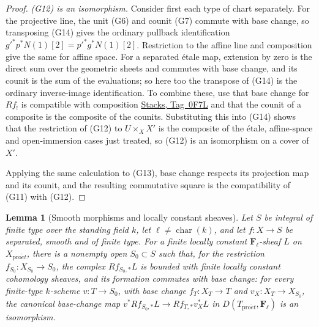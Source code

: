 \documentclass[11pt,a4paper]{article}
\numberwithin{equation}{section}
\newtheorem{lemma}[theorem]{Lemma}
\theoremstyle{definition}
\theoremstyle{remark}
\newcommand{\Fell}{\mathbf F_\ell}
\newcommand{\proet}{\mathrm{pro}\acute{e}t}
\newcommand{\stacks}[1]{\href{https://stacks.math.columbia.edu/tag/#1}{\textnormal{Stacks, Tag~#1}}}
\begin{document}
\begin{proof}
\emph{(G12) is an isomorphism.} Consider first each type of chart
separately. For the projective line, the unit (G6) and counit (G7)
commute with base change, so transposing (G14) gives the ordinary
pullback identification \(g'^*p^*N(1)[2]=p'^*g^*N(1)[2]\). Restriction
to the affine line and composition give the same for affine space. For
a separated \'etale map, extension by zero is the direct sum over the
geometric sheets and commutes with base change, and its counit is the
sum of the evaluations; so here too the transpose of (G14) is the
ordinary inverse-image identification. To combine these, use that base
change for \(Rf_!\) is compatible with composition \stacks{0F7L} and
that the counit of a composite is the composite of the counits.
Substituting this into (G14) shows that the restriction of (G12) to
\(U\times_XX'\) is the composite of the \'etale, affine-space and
open-immersion cases just treated, so (G12) is an isomorphism on a
cover of \(X'\).

Applying the same calculation to (G13), base change respects its
projection map and its counit, and the resulting commutative square is
the compatibility of (G11) with (G12).
\end{proof}

\begin{lemma}[Smooth morphisms and locally constant sheaves]
\label{b:lem:geo-smooth-generic}
Let \(S\) be integral of finite type over the standing field \(k\), let
\(\ell\ne\operatorname{char}(k)\), and let \(f:X\to S\) be separated,
smooth and of finite type. For a finite locally constant
\(\Fell\)-sheaf \(L\) on \(X_{\proet}\), there is a nonempty open
\(S_0\subset S\) such that, for the restriction
\(f_{S_0}:X_{S_0}\to S_0\), the complex \(Rf_{S_0,*}L\) is bounded with
finite locally constant cohomology sheaves, and its formation commutes
with base change: for every finite-type $k$-scheme \(v:T\to S_0\), with
base change \(f_T:X_T\to T\) and \(v_X:X_T\to X_{S_0}\), the canonical
base-change map \(v^*Rf_{S_0,*}L\to Rf_{T,*}v_X^*L\) in
\(D(T_{\proet},\Fell)\) is an isomorphism.
\end{lemma}
\end{document}

